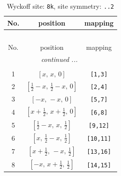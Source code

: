 \documentclass[fleqn,8pt]{jsarticle}
\begin{document}
\begin{longtable}{ccc}
\caption{Wyckoff site: {\tt 8k}, site symmetry: {\tt ..2}}
 \\
 \hline \hline
No. & position & mapping \\ \hline \endfirsthead

\multicolumn{2}{l}{\tablename\ \thetable{}} \\
 \hline \hline
No. & position & mapping \\ \hline \endhead

 \hline \hline
\multicolumn{2}{r}{\footnotesize\it continued ...} \\ \endfoot

 \hline \hline
\multicolumn{2}{r}{} \\ \endlastfoot

1 & $\left[ x,\, x,\, 0 \right]$ & {\tt [1,3]} \\ \hline
2 & $\left[ \frac{1}{2} - x,\, \frac{1}{2} - x,\, 0 \right]$ & {\tt [2,4]} \\ \hline
3 & $\left[ - x,\, - x,\, 0 \right]$ & {\tt [5,7]} \\ \hline
4 & $\left[ x + \frac{1}{2},\, x + \frac{1}{2},\, 0 \right]$ & {\tt [6,8]} \\ \hline
5 & $\left[ \frac{1}{2} - x,\, x,\, \frac{1}{2} \right]$ & {\tt [9,12]} \\ \hline
6 & $\left[ x,\, \frac{1}{2} - x,\, \frac{1}{2} \right]$ & {\tt [10,11]} \\ \hline
7 & $\left[ x + \frac{1}{2},\, - x,\, \frac{1}{2} \right]$ & {\tt [13,16]} \\ \hline
8 & $\left[ - x,\, x + \frac{1}{2},\, \frac{1}{2} \right]$ & {\tt [14,15]} \\
\end{longtable}
\renewcommand{\arraystretch}{1.2}
\end{document}
